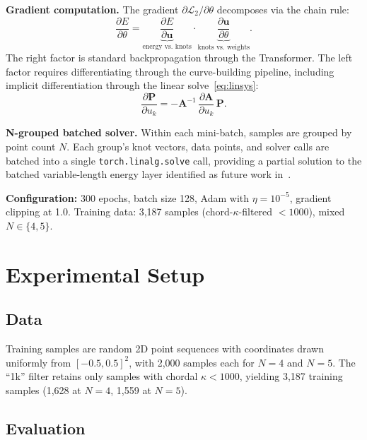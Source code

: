 \documentclass[11pt, a4paper]{article}
\newcommand{\bP}{\mathbf{P}}
\newcommand{\bA}{\mathbf{A}}
\newcommand{\bu}{\mathbf{u}}
\begin{document}
\textbf{Gradient computation.}
The gradient $\partial \mathcal{L}_2 / \partial \theta$ decomposes via the
chain rule:
\begin{equation}
  \frac{\partial E}{\partial \theta} =
    \underbrace{\frac{\partial E}{\partial \bu}}_{\text{energy vs.\ knots}}
    \cdot
    \underbrace{\frac{\partial \bu}{\partial \theta}}_{\text{knots vs.\ weights}}.
  \label{eq:chainrule}
\end{equation}
The right factor is standard backpropagation through the Transformer. The
left factor requires differentiating through the curve-building pipeline,
including implicit differentiation through the linear
solve~\eqref{eq:linsys}:
\begin{equation}
  \frac{\partial \bP}{\partial u_k} =
    -\bA^{-1}\,\frac{\partial \bA}{\partial u_k}\,\bP.
  \label{eq:implicit_diff}
\end{equation}

\textbf{N-grouped batched solver.}
Within each mini-batch, samples are grouped by point count $N$. Each
group's knot vectors, data points, and solver calls are batched into a
single \texttt{torch.linalg.solve} call, providing a partial solution to
the batched variable-length energy layer identified as future work
in~\cite[§7.3]{Chhetri2024}.

\textbf{Configuration:} 300 epochs, batch size 128, Adam with
$\eta = 10^{-5}$, gradient clipping at 1.0. Training data:
3{,}187 samples (chord-$\kappa$-filtered $< 1000$),
mixed $N \in \{4, 5\}$.


\section{Experimental Setup}
\label{sec:setup}

\subsection{Data}

Training samples are random 2D point sequences with coordinates drawn
uniformly from $[-0.5, 0.5]^2$, with 2{,}000 samples each for
$N = 4$ and $N = 5$. The ``1k'' filter retains only samples with
chordal $\kappa < 1000$, yielding 3{,}187 training samples
(1{,}628 at $N = 4$, 1{,}559 at $N = 5$).

\subsection{Evaluation}
\end{document}
